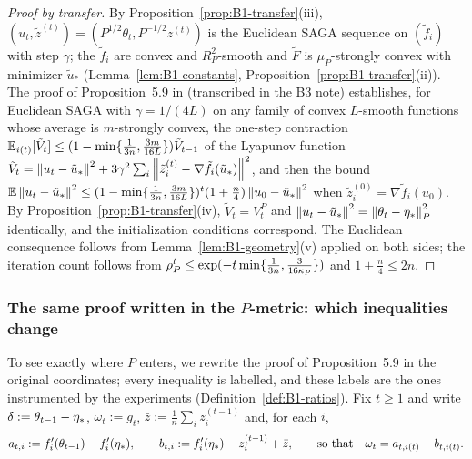 \begin{proof}[Proof by transfer]
By Proposition~\ref{prop:B1-transfer}(iii), $(u_t,\tilde z^{(t)})=(P^{1/2}\theta_t,P^{-1/2}z^{(t)})$ is the
Euclidean SAGA sequence on $(\tilde f_i)$ with step $\gamma$; the $\tilde f_i$ are convex and
$R_P^2$-smooth and $\tilde F$ is $\mu_P$-strongly convex with minimizer $\tilde u_*$
(Lemma~\ref{lem:B1-constants}, Proposition~\ref{prop:B1-transfer}(ii)). The proof of Proposition~5.9 in
\cite{bach2024learning} (transcribed in the B3 note) establishes, for Euclidean SAGA with $\gamma=1/(4L)$ on
any family of convex $L$-smooth functions whose average is $m$-strongly convex, the one-step contraction
$\mathbb{E}_{i(t)}[\tilde V_t]\le(1-\min\{\frac1{3n},\frac{3m}{16L}\})\tilde V_{t-1}$ of the Lyapunov function
$\tilde V_t=\left\|u_t-\tilde u_*\right\|^2+3\gamma^2\sum_i\left\|\tilde z_i^{(t)}-\nabla\tilde f_i(\tilde u_*)\right\|^2$,
and then the bound $\mathbb{E}\left\|u_t-\tilde u_*\right\|^2\le(1-\min\{\frac1{3n},\frac{3m}{16L}\})^t(1+\frac n4)
\left\|u_0-\tilde u_*\right\|^2$ when $\tilde z_i^{(0)}=\nabla\tilde f_i(u_0)$. By
Proposition~\ref{prop:B1-transfer}(iv), $\tilde V_t=V_t^P$ and
$\left\|u_t-\tilde u_*\right\|^2=\left\|\theta_t-\eta_\ast\right\|_P^2$ identically, and the initialization conditions
correspond. The Euclidean consequence follows from Lemma~\ref{lem:B1-geometry}(v) applied on both sides;
the iteration count follows from $\rho_P^t\le\exp(-t\min\{\frac1{3n},\frac3{16\kappa_P}\})$ and
$1+\frac n4\le 2n$.
\end{proof}

\subsubsection{The same proof written in the \texorpdfstring{$P$}{P}-metric: which inequalities change}
\label{sec:B1-proofP}

To see exactly where $P$ enters, we rewrite the proof of Proposition~5.9 in the original coordinates;
every inequality is labelled, and these labels are the ones instrumented by the experiments
(Definition~\ref{def:B1-ratios}). Fix $t\ge1$ and write $\delta:=\theta_{t-1}-\eta_\ast$,
$\omega_t:=g_t$, $\bar z:=\frac1n\sum_i z_i^{(t-1)}$ and, for each $i$,
\[
a_{t,i}:=f'_i(\theta_{t-1})-f'_i(\eta_\ast),\qquad
b_{t,i}:=f'_i(\eta_\ast)-z_i^{(t-1)}+\bar z,\qquad\text{so that}\quad \omega_t=a_{t,i(t)}+b_{t,i(t)} .
\]

